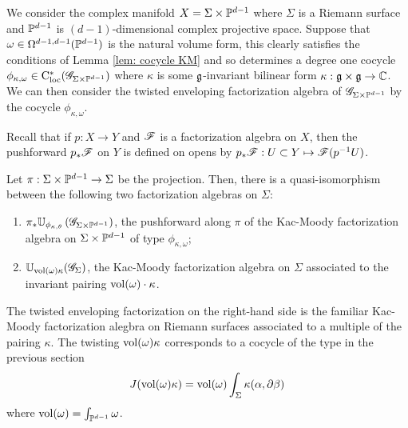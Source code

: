 \documentclass[10pt]{amsart}
\begin{document}
\begin{eg}
We consider the complex manifold $X = \Sigma \times \mathbb P^{d-1}$ where $\Sigma$ is a Riemann surface and $\mathbb P^{d-1}$ is $(d-1)$-dimensional complex projective space.
Suppose that $\omega \in \Omega^{d-1,d-1}(\mathbb P^{d-1})$ is the natural volume form, this clearly satisfies the conditions of Lemma \ref{lem: cocycle KM} and so determines a degree one cocycle $\phi_{\kappa, \omega} \in {\rm C}_{\rm loc}^*(\mathscr G_{\Sigma \times \mathbb P^{d-1}})$ where $\kappa$ is some $\mathfrak g$-invariant bilinear form $\kappa : \mathfrak g \times \mathfrak g \to \mathbb C$. 
We can then consider the twisted enveloping factorization algebra of $\mathscr G_{\Sigma \times \mathbb P^{d-1}}$ by the cocycle $\phi_{\kappa, \omega}$. 

Recall that if $p : X \to Y$ and $\mathscr F$ is a factorization algebra on $X$, then the pushforward $p_* \mathscr F$ on $Y$ is defined on opens by $p_* \mathscr F : U \subset Y \mapsto \mathscr F(p^{-1} U)$. 

\begin{prop}
Let $\pi : \Sigma \times \mathbb P^{d-1} \to \Sigma$ be the projection. 
Then, there is a quasi-isomorphism between the following two factorization algebras on $\Sigma$:
\begin{enumerate}
\item $\pi_* \mathbb U_{\phi_{\kappa, \theta}} \left(\mathscr G_{\Sigma \times \mathbb P^{d-1}}\right)$, the pushforward along $\pi$ of the Kac-Moody factorization algebra on $\Sigma \times \mathbb P^{d-1}$ of type $\phi_{\kappa,\omega}$;
\item $\mathbb U_{{\rm vol}(\omega) \kappa} (\mathscr G_\Sigma)$, the Kac-Moody factorization algebra on $\Sigma$ associated to the invariant pairing ${\rm vol}(\omega) \cdot \kappa$. 
\end{enumerate}
\end{prop}

The twisted enveloping factorization on the right-hand side is the familiar Kac-Moody factorization alegbra on Riemann surfaces associated to a multiple of the pairing $\kappa$.
The twisting ${\rm vol}(\omega) \kappa$ corresponds to a cocycle of the type in the previous section 
\[
J({\rm vol}(\omega) \kappa) = {\rm vol}(\omega) \int_\Sigma \kappa(\alpha, \partial \beta)
\]
where ${\rm vol}(\omega) = \int_{\mathbb P^{d-1}} \omega$. 


\end{eg}
\end{document}
